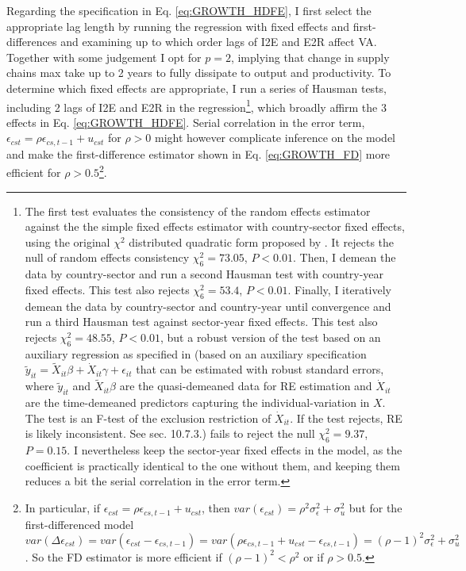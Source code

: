 \documentclass[a4paper]{article}
\begin{document}
Regarding the specification in Eq. \ref{eq:GROWTH_HDFE}, I first select the appropriate lag length by running the regression with fixed effects and first-differences and examining up to which order lags of I2E and E2R affect VA. Together with some judgement I opt for $p = 2$, implying that change in supply chains max take up to 2 years to fully dissipate to output and productivity. To determine which fixed effects are appropriate, I run a series of Hausman tests, including 2 lags of I2E and E2R in the regression\footnote{The first test evaluates the consistency of the random effects estimator against the the  simple fixed effects estimator with country-sector fixed effects, using the original $\chi^2$ distributed quadratic form proposed by \citet{hausman1978specification}. It rejects the null of random effects consistency $\chi^2_6 = 73.05$, $P < 0.01$. Then, I demean the data by country-sector and run a second Hausman test with country-year fixed effects. This test also rejects $\chi^2_6 = 53.4$, $P < 0.01$. Finally, I iteratively demean the data by country-sector and country-year until convergence and run a third Hausman test against sector-year fixed effects. This test also rejects $\chi^2_6 = 48.55$, $P < 0.01$, but a robust version of the test based on an auxiliary regression as specified in \citet{wooldridge2010econometric} (based on an auxiliary specification $\tilde{y}_{it} = \tilde{X}_{it}\beta + \dot{X}_{it}\gamma + \epsilon_{it}$ that can be estimated with robust standard errors, where  $\tilde{y}_{it} $ and $\tilde{X}_{it}\beta$ are the quasi-demeaned data for RE estimation and $\dot{X}_{it}$ are the time-demeaned predictors capturing the individual-variation in $X$. The test is an F-test of the exclusion restriction of $\dot{X}_{it}$. If the test rejects, RE is likely inconsistent. See \citet{wooldridge2010econometric} sec. 10.7.3.) fails to reject the null $\chi^2_6 = 9.37$, $P = 0.15$. I nevertheless keep the sector-year fixed effects in the model, as the coefficient is practically identical to the one without them, and keeping them reduces a bit the serial correlation in the error term.}, which broadly affirm the 3 effects in Eq. \ref{eq:GROWTH_HDFE}. Serial correlation in the error term, $\epsilon_{cst} = \rho \epsilon_{cs,t-1} + u_{cst}$ for $\rho > 0$ might however complicate inference on the model and make the first-difference estimator shown in Eq. \ref{eq:GROWTH_FD} more efficient for $\rho > 0.5$\footnote{In particular, if $\epsilon_{cst} = \rho \epsilon_{cs,t-1} + u_{cst}$, then $var(\epsilon_{cst}) = \rho^2 \sigma^2_\epsilon + \sigma^2_u$ but for the first-differenced model $var(\Delta \epsilon_{cst}) = var(\epsilon_{cst} - \epsilon_{cs,t-1}) = var(\rho \epsilon_{cs,t-1} + u_{cst} - \epsilon_{cs,t-1}) = (\rho-1)^2 \sigma^2_\epsilon + \sigma^2_u$. So the FD estimator is more efficient if $(\rho-1)^2<\rho^2$ or if $\rho > 0.5$.}.
\end{document}
